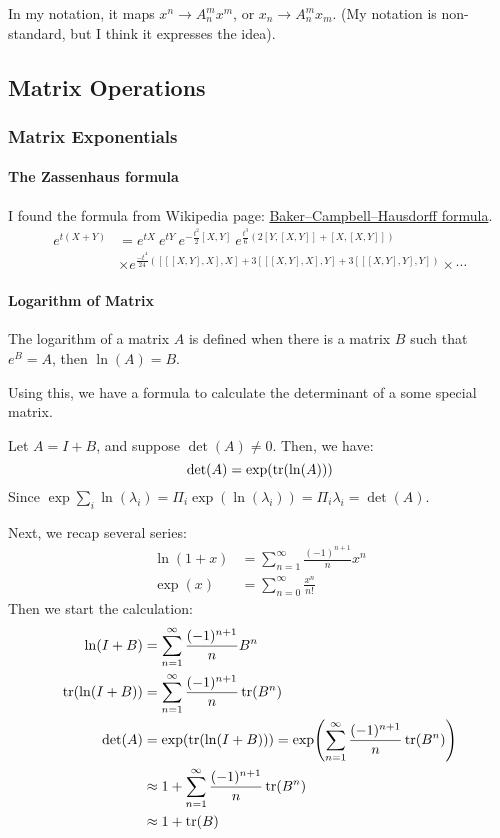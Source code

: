     In my notation, it maps $x^n\to A^m_n x^m$, or $x_n\to A^m_n x_m$.
    (My notation is non-standard, but I think it expresses the idea).


\subsection{Matrix Operations}
    \subsubsection{Matrix Exponentials}
    \label{sec:Matrix-Exponentials}
    \paragraph{The Zassenhaus formula}
    I found the formula from Wikipedia page:
    \href{https://en.wikipedia.org/wiki/Baker%E2%80%93Campbell%E2%80%93Hausdorff_formula}{Baker–Campbell–Hausdorff formula}.
    \begin{align}
        e^{t(X+Y)} &= e^{tX}~ e^{tY} ~e^{-\frac{t^2}{2} [X,Y]} ~
        e^{\frac{t^3}{6}(2[Y,[X,Y]]+ [X,[X,Y]] )} \nonumber\\
        & \times
          e^{\frac{-t^4}{24}([[[X,Y],X],X] + 3[[[X,Y],X],Y] + 3[[[X,Y],Y],Y]) }
        \times\cdots
    \end{align}

    \paragraph{Logarithm of Matrix}
    The logarithm of  a matrix $A$ is defined when there is a matrix $B$ such that
    $e^B=A$, then $\ln(A)=B$.

    Using this, we have a formula to calculate the determinant of a some special
    matrix.

    Let $A = I + B$, and suppose $\det(A)\neq
    0$. Then, we have:
    \begin{equation}
        \det(A) = \exp(\tr(\ln(A)))
    \end{equation}
    Since $\exp{\sum_i \ln(\lambda_i)} = \Pi_i \exp(\ln(\lambda_i))=\Pi_i
    \lambda_i=\det(A)$.

    Next, we recap several series:
    \begin{align*}
        \ln(1+x) &= \sum_{n=1}^{\infty} \frac{(-1)^{n+1}}{n}x^n \\
        \exp(x) &= \sum_{n=0}^{\infty} \frac{x^n}{n!}
    \end{align*}
    Then we start the calculation:
    \begin{align*}
        \ln(I+B) &= \sum_{n=1}^{\infty} \frac{(-1)^{n+1}}{n}B^n \\
        \tr(\ln(I+B)) &= \sum_{n=1}^{\infty} \frac{(-1)^{n+1}}{n}\tr(B^n) \\
        \det(A) &= \exp(\tr(\ln(I+B))) 
            = \exp(\sum_{n=1}^{\infty} \frac{(-1)^{n+1}}{n}\tr(B^n)) \\
            &\approx 1+ \sum_{n=1}^{\infty} \frac{(-1)^{n+1}}{n}\tr(B^n) \\
            &\approx 1+ \tr(B)
    \end{align*}

